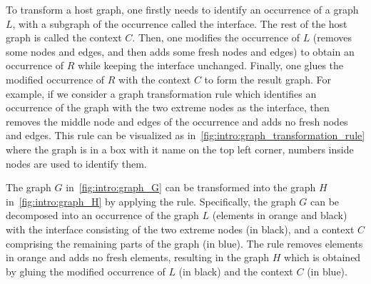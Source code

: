   To transform a host graph,
   one firstly needs to identify an occurrence of a graph $L$, with a subgraph of the occurrence called the interface. 
   The rest of the host graph is called the context $C$.
   Then, one
   modifies the occurrence of $L$ (removes some nodes and edges, and then adds some fresh nodes and edges)
   to obtain an occurrence of $R$ while keeping the interface unchanged.
   Finally, one glues the modified occurrence of $R$ with the context $C$ 
   to form the result graph. For example, if we consider a graph transformation rule which identifies an occurrence of the graph  with the two extreme nodes as the interface, then removes the middle node and edges of the occurrence and adds no fresh nodes and edges.
This rule can be visualized as in~\autoref{fig:intro:graph_transformation_rule} where the graph is in a box with it name on the top left corner, numbers inside nodes are used to identify them.
\begin{figure}[htbp]
    \centering
    \caption{}
    \label{fig:intro:graph_transformation_rule}
\end{figure}
The graph $G$ in~\autoref{fig:intro:graph_G} can be transformed into the graph $H$ in~\autoref{fig:intro:graph_H} by applying the rule. Specifically, the graph $G$ can be decomposed into an occurrence of the graph $L$ (elements in orange and black) with the interface consisting of the two extreme nodes (in black), and a context $C$ comprising the remaining parts of the graph (in blue). The rule removes elements in orange and adds no fresh elements, resulting in the graph $H$ which is obtained by gluing the modified occurrence of $L$ (in black) and the context $C$ (in blue). 

